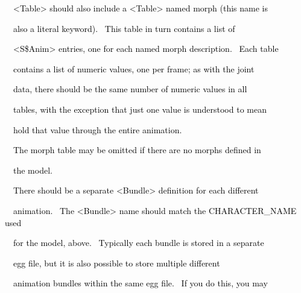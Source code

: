\documentclass[a4paper]{article}
\newcommand\textstyleOOoComputerKeyWord[1]{\textrm{\textcolor[rgb]{0.0,0.0,0.5019608}{#1}}}
\begin{document}
{\color{black}
\textstyleOOoComputerKeyWord{\textcolor{black}{\ \ {\textless}Table{\textgreater} should also include a
{\textless}Table{\textgreater} named {\textquotedbl}morph{\textquotedbl} (this name is}}}

{\color{black}
\textstyleOOoComputerKeyWord{\textcolor{black}{\ \ also a literal keyword). \ This table in turn contains a list of}}}

{\color{black}
\textstyleOOoComputerKeyWord{\textcolor{black}{\ \ {\textless}S\$Anim{\textgreater} entries, one for each named morph
description. \ Each table}}}

{\color{black}
\textstyleOOoComputerKeyWord{\textcolor{black}{\ \ contains a list of numeric values, one per frame; as with the
joint}}}

{\color{black}
\textstyleOOoComputerKeyWord{\textcolor{black}{\ \ data, there should be the same number of numeric values in all}}}

{\color{black}
\textstyleOOoComputerKeyWord{\textcolor{black}{\ \ tables, with the exception that just one value is understood to
mean}}}

{\color{black}
\textstyleOOoComputerKeyWord{\textcolor{black}{\ \ hold that value through the entire animation.}}}


\bigskip

{\color{black}
\textstyleOOoComputerKeyWord{\textcolor{black}{\ \ The {\textquotedbl}morph{\textquotedbl} table may be omitted if there
are no morphs defined in}}}

{\color{black}
\textstyleOOoComputerKeyWord{\textcolor{black}{\ \ the model.}}}


\bigskip

{\color{black}
\textstyleOOoComputerKeyWord{\textcolor{black}{\ \ There should be a separate {\textless}Bundle{\textgreater} definition
for each different}}}

{\color{black}
\textstyleOOoComputerKeyWord{\textcolor{black}{\ \ animation. \ The {\textless}Bundle{\textgreater} name should match
the CHARACTER\_NAME used}}}

{\color{black}
\textstyleOOoComputerKeyWord{\textcolor{black}{\ \ for the model, above. \ Typically each bundle is stored in a
separate}}}

{\color{black}
\textstyleOOoComputerKeyWord{\textcolor{black}{\ \ egg file, but it is also possible to store multiple different}}}

{\color{black}
\textstyleOOoComputerKeyWord{\textcolor{black}{\ \ animation bundles within the same egg file. \ If you do this, you
may}}}
\end{document}
